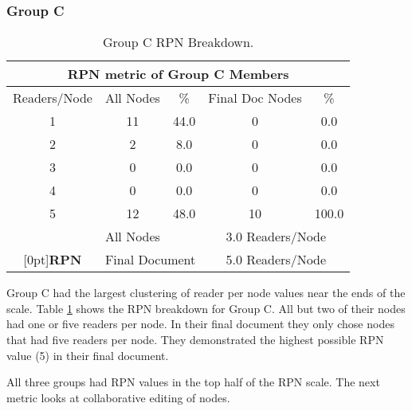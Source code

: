 \subsubsection{Group C}

\small
\begin{table}[htb]
  \caption{Group C RPN Breakdown.}
  \begin{center}  
    \begin{tabular}{|c|c|c|c|c|}
      \hline
      \multicolumn{5}{|c|}{\rule[-3mm]{0mm}{8mm}\bf RPN metric of Group C
      Members}\\ 
      \hline
      Readers/Node&All Nodes&\%&Final Doc Nodes&\%\\ \hline
      \hline
      1&11&44.0&0&0.0\\ \hline
      2&2&8.0&0&0.0\\ \hline
      3&0&0.0&0&0.0\\ \hline
      4&0&0.0&0&0.0\\\hline 
      5&12&48.0&10&100.0\\\hline
      \hline
      &\multicolumn{2}{|l|}{All Nodes}&\multicolumn{2}{|c|}{3.0
      Readers/Node}\\ \cline{2-5} 
      \raisebox{1.5ex}[0pt]{\bf RPN}&\multicolumn{2}{|l|}{Final
      Document}&\multicolumn{2}{|c|}{5.0 Readers/Node}\\\hline
    \end{tabular}
  \end{center}  
  \label{tab:Na-reading}
\end{table}
\normalsize


Group C had the largest clustering of reader per node values near the
ends of the scale.  Table \ref{tab:Na-reading} shows the RPN breakdown for
Group C.  All but two of their nodes had one or five readers per node.
In their final document they only chose nodes that had five readers per
node.  They demonstrated the highest possible RPN value (5) in their final
document.


All three groups had RPN values in the top half of the RPN scale.
The next metric looks at collaborative editing of nodes. 



